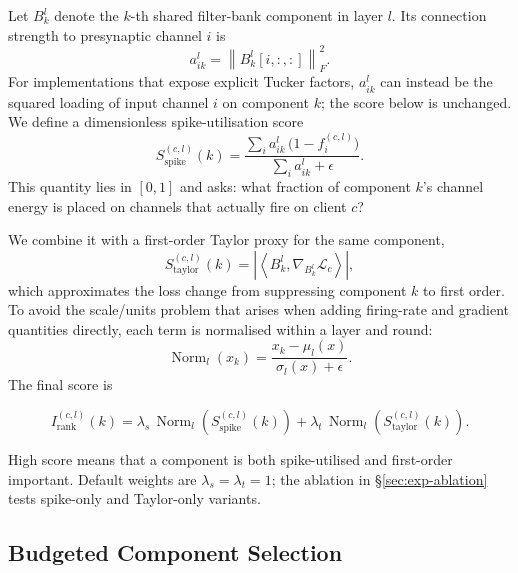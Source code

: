 \documentclass{article} %
\begin{document}
Let $B_k^l$ denote the $k$-th shared filter-bank component in layer $l$. Its connection strength to presynaptic channel $i$ is
\begin{equation}
a_{ik}^{l} = \left\|B_k^l[i,:,:]\right\|_F^2.
\label{eq:component-channel-energy}
\end{equation}
For implementations that expose explicit Tucker factors, $a_{ik}^{l}$ can instead be the squared loading of input channel $i$ on component $k$; the score below is unchanged. We define a dimensionless spike-utilisation score
\begin{equation}
S_{\text{spike}}^{(c,l)}(k)
= \frac{\sum_i a_{ik}^{l}\,\big(1-f_i^{(c,l)}\big)}{\sum_i a_{ik}^{l}+\epsilon}.
\label{eq:spike-component-score}
\end{equation}
This quantity lies in $[0,1]$ and asks: what fraction of component $k$'s channel energy is placed on channels that actually fire on client $c$?

We combine it with a first-order Taylor proxy for the same component,
\begin{equation}
S_{\text{taylor}}^{(c,l)}(k)
= \left|\left\langle B_k^l,\nabla_{B_k^l}\mathcal{L}_c\right\rangle\right|,
\label{eq:taylor-component-score}
\end{equation}
which approximates the loss change from suppressing component $k$ to first order. To avoid the scale/units problem that arises when adding firing-rate and gradient quantities directly, each term is normalised within a layer and round:
\begin{equation}
\operatorname{Norm}_l(x_k)=\frac{x_k-\mu_l(x)}{\sigma_l(x)+\epsilon}.
\label{eq:normalisation}
\end{equation}
The final score is
\begin{tcolorbox}[colback=blue!4,colframe=blue!50,boxsep=2pt,left=4pt,right=4pt]
\begin{equation}
I_{\text{rank}}^{(c,l)}(k)
= \lambda_s\,\operatorname{Norm}_l\!\left(S_{\text{spike}}^{(c,l)}(k)\right)
+ \lambda_t\,\operatorname{Norm}_l\!\left(S_{\text{taylor}}^{(c,l)}(k)\right).
\label{eq:rank-score}
\end{equation}
\end{tcolorbox}
High score means that a component is both spike-utilised and first-order important. Default weights are $\lambda_s=\lambda_t=1$; the ablation in \S\ref{sec:exp-ablation} tests spike-only and Taylor-only variants.

\subsection{Budgeted Component Selection}
\label{sec:method-budget}
\end{document}
